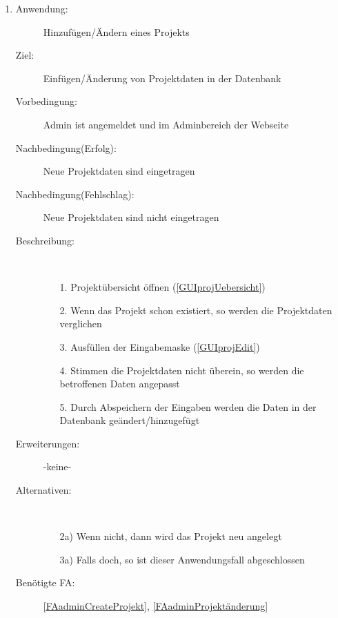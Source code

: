 \documentclass[parskip=full]{scrartcl}
\newcommand{\swtLabel}[1]{\textbf{/#1\arabic*0/}}
\begin{document}
\begin{enumerate} [label=\swtLabel{A}]
  \item \label{UCadminProjektErstellenÄndern}
    \begin{description}
  	\item[Anwendung:] Hinzufügen/Ändern eines \gls{Projekt}s
  	\item[Ziel:] Einfügen/Änderung von \gls{Projekt}daten in der Datenbank
  	\item[Vorbedingung:] \gls{Admin} ist angemeldet und im \gls{Admin}bereich der Webseite
  	\item[Nachbedingung(Erfolg):] Neue \gls{Projekt}daten sind eingetragen
  	\item[Nachbedingung(Fehlschlag):] Neue \gls{Projekt}daten sind nicht eingetragen
  	\item[Beschreibung:]~
  	\begin{enumerate} 
  	  \item[1.] \gls{Projekt}übersicht öffnen (\autoref{GUIprojUebersicht})
  	  \item[2.] Wenn das \gls{Projekt} schon existiert, so werden die \gls{Projekt}daten
  	  verglichen
  	  \item[3.] Ausfüllen der Eingabemaske (\autoref{GUIprojEdit})
  	  \item[4.] Stimmen die \gls{Projekt}daten nicht überein, so werden die betroffenen
  	  Daten angepasst
  	  \item[5.] Durch Abspeichern der Eingaben werden die Daten in der Datenbank
  	  geändert/hinzugefügt
  	\end{enumerate}
  	\item[Erweiterungen:] -keine-
  	\item[Alternativen:]~
  	\begin{enumerate}
  	  \item[2a)] Wenn nicht, dann wird das \gls{Projekt} neu angelegt
  	  \item[3a)] Falls doch, so ist dieser Anwendungsfall abgeschlossen
  	\end{enumerate} 
  	\item[Benötigte FA:] \ref{FAadminCreateProjekt}, \ref{FAadminProjektänderung}
  \end{description}
   

\end{enumerate}
\end{document}
